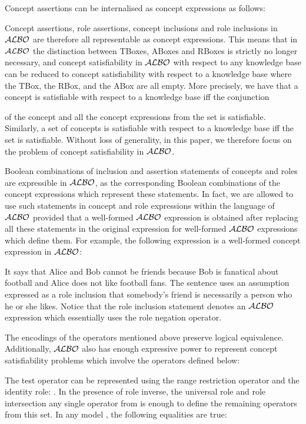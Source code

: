\documentclass[leqno
,pdflatex
,prodmode
,acmtocl
]{acmsmall}
\newcommand{\mathcmd}[1]{\ensuremath{#1}\xspace}
\newcommand{\dlfont}{\mathcal}
\newcommand{\dl}[1]{\mathcmd{\dlfont{#1}}}
\newcommand{\ALBOid}{\dl{ALBO\smash[t]{\mbox{}}}}
\begin{document}
Concept assertions can be internalised as concept expressions
as follows:


Concept assertions, role assertions, concept inclusions and role
inclusions in \ALBOid are therefore all representable as concept
expressions.
This means that in \ALBOid the distinction between TBoxes, ABoxes and
RBoxes is strictly no longer necessary, and concept satisfiability in
\ALBOid with respect to any knowledge base can be reduced to concept
satisfiability with respect to a knowledge base where the TBox, the RBox,
and the ABox are all empty.
More precisely, we have that a concept  is satisfiable with respect to a knowledge
base  iff\label{page: eliminating knowledge base} the conjunction 

of the concept
 and all the concept expressions from the set 
is satisfiable. 
Similarly, a set  of concepts is satisfiable with
respect to a knowledge base   iff the set  is satisfiable.
Without loss of generality, in this paper, we therefore focus on the
problem of concept satisfiability in \ALBOid.

Boolean combinations of inclusion and assertion statements
of concepts and roles are expressible in \ALBOid, as the
corresponding Boolean combinations of the concept expressions which represent
these statements.
In fact,  
we are allowed to use such statements in concept and role expressions
within the language of \ALBOid provided that 
a well-formed \ALBOid expression is obtained
after replacing  
all these statements 
in the original expression
for well-formed \ALBOid expressions which define them.
For example, the following expression is a well-formed concept expression in \ALBOid:

It says that Alice and Bob cannot be friends because Bob is fanatical
about football and Alice does not like football fans.
The sentence uses an assumption expressed as a role inclusion that
somebody's friend is necessarily a person who he or she likes.
Notice that the role inclusion statement denotes an \ALBOid
expression which essentially uses the role negation operator.

The encodings of the operators mentioned above
preserve logical equivalence. 
Additionally,
\ALBOid also has enough expressive power to
represent concept satisfiability problems 
which involve the operators defined below: 

The test operator can be represented using the range restriction operator and the identity role:
.
In the presence of role inverse, the universal role and role intersection
any single operator from  is enough to define the
remaining operators from this set. 
In any model , the following equalities are
true:
\end{document}
